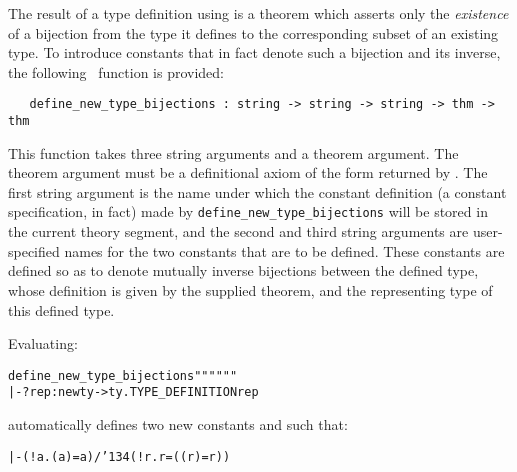 The result of a type definition using  is a theorem
which asserts only the {\it existence\/} of a
bijection
from the type it defines to the corresponding subset of an existing type.  To
introduce constants that in fact denote such a bijection and its inverse, the
following \ML\ function is provided:

\begin{boxed}
\begin{verbatim}
   define_new_type_bijections : string -> string -> string -> thm -> thm
\end{verbatim}\end{boxed}

\noindent This function takes three string arguments and a theorem argument.
The theorem argument must be a definitional axiom of the form returned by
.  The first string argument is the name under which
the constant definition (a constant specification, in fact) made by
{\small\verb!define_new_type_bijections!} will be stored in the current theory
segment, and the second and third string arguments are user-specified names for
the two constants that are to be defined. These constants are defined so as to
denote mutually inverse bijections between the defined type, whose definition
is given by the supplied theorem, and the representing type of this defined
type.

Evaluating:

\medskip
{\def\op{{\normalsize\sl op}}
\begin{hol}\begin{alltt}
   define\_new\_type\_bijections "" "" ""
           |- ?rep:newty->ty. TYPE\_DEFINITION  rep
\end{alltt}\end{hol}}

\medskip

\noindent automatically defines two new constants
 and 
such that:

{\def\bk{\char'134}
\begin{hol}\begin{alltt}
   |- (!a. ( a) = a) /\bk (!r.  r = (( r) = r))
\end{alltt}\end{hol}}

